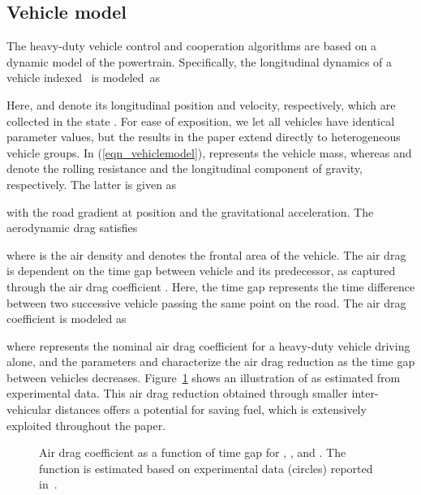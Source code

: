 \documentclass[journal]{IEEEtran}
\begin{document}
\subsection{Vehicle model}\label{sec_vehiclemodel}
The heavy-duty vehicle control and cooperation algorithms are based on a dynamic model of the powertrain. Specifically, the longitudinal dynamics of a vehicle indexed~ is modeled~as

Here,  and  denote its longitudinal position and velocity, respectively, which are collected in the state . For ease of exposition, we let all vehicles have identical parameter values, but the results in the paper extend directly to heterogeneous vehicle groups. In (\ref{eqn_vehiclemodel}),  represents the vehicle mass, whereas  and  denote the rolling resistance and the longitudinal component of gravity, respectively. The latter is given as

with  the road gradient at position  and  the gravitational acceleration. The aerodynamic drag  satisfies

where  is the air density and  denotes the frontal area of the vehicle. The air drag is dependent on the time gap  between vehicle  and its predecessor, as captured through the air drag coefficient . Here, the time gap represents the time difference between two successive vehicle passing the same point on the road. The air drag coefficient is modeled as

where  represents the nominal air drag coefficient for a heavy-duty vehicle driving alone, and the parameters  and  characterize the air drag reduction as the time gap between vehicles decreases. Figure~\ref{fig_airdragcoefficient} shows an illustration of  as estimated from experimental data. This air drag reduction obtained through smaller inter-vehicular distances offers a potential for saving fuel, which is extensively exploited throughout the paper.

\begin{figure}
\begin{center}
\vskip-2mm\caption{Air drag coefficient  as a function of time gap  for , , and . The function is estimated based on experimental data (circles) reported in~\cite{book_hucho_1998}.}
  \label{fig_airdragcoefficient}
\end{center}
\end{figure}
\end{document}
